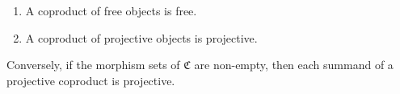 \begin{enumerate}
\item[(i)] A coproduct of free objects is free.
\item[(ii)] A coproduct of projective objects is projective.
\end{enumerate}
Conversely, if the morphism sets of $\mathfrak{C}$ are non-empty, then each summand of a projective coproduct is projective.

